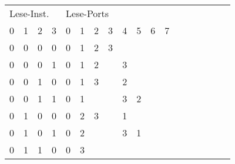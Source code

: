 \begin{table}[htbp]
\begin{minipage}{.4\textwidth}
		\begin{tabular}{cccccccccccccccccc}
			\multicolumn{4}{l}{Lese-Inst.}                 & \multicolumn{8}{|l}{Lese-Ports}                                                               \\ 
			\multicolumn{1}{c}{0} & \multicolumn{1}{c}{1} & \multicolumn{1}{c}{2} & \multicolumn{1}{c}{3} & \multicolumn{1}{|c}{0} & \multicolumn{1}{c}{1} & \multicolumn{1}{c}{2}& \multicolumn{1}{c}{3} &
			\multicolumn{1}{c}{4} & \multicolumn{1}{c}{5} & \multicolumn{1}{c}{6}& \multicolumn{1}{c}{7} \\
			\hline
			\multicolumn{1}{c}{0} & \multicolumn{1}{c}{0} & \multicolumn{1}{c}{0} & \multicolumn{1}{c}{0} & \multicolumn{1}{|c}{0} & \multicolumn{1}{c}{1} & \multicolumn{1}{c}{2}& \multicolumn{1}{c}{3} &
			\multicolumn{1}{c}{} & \multicolumn{1}{c}{} & \multicolumn{1}{c}{}& \multicolumn{1}{c}{} \\
			\multicolumn{1}{c}{0} & \multicolumn{1}{c}{0} & \multicolumn{1}{c}{0} & \multicolumn{1}{c}{1} & \multicolumn{1}{|c}{0} & \multicolumn{1}{c}{1} & \multicolumn{1}{c}{2}& \multicolumn{1}{c}{} &
			\multicolumn{1}{c}{3} & \multicolumn{1}{c}{} & \multicolumn{1}{c}{}& \multicolumn{1}{c}{} \\
			\multicolumn{1}{c}{0} & \multicolumn{1}{c}{0} & \multicolumn{1}{c}{1} & \multicolumn{1}{c}{0} & \multicolumn{1}{|c}{0} & \multicolumn{1}{c}{1} & \multicolumn{1}{c}{3}& \multicolumn{1}{c}{} &
			\multicolumn{1}{c}{2} & \multicolumn{1}{c}{} & \multicolumn{1}{c}{}& \multicolumn{1}{c}{} \\
			\multicolumn{1}{c}{0} & \multicolumn{1}{c}{0} & \multicolumn{1}{c}{1} & \multicolumn{1}{c}{1} & \multicolumn{1}{|c}{0} & \multicolumn{1}{c}{1} & \multicolumn{1}{c}{}& \multicolumn{1}{c}{} &
			\multicolumn{1}{c}{3} & \multicolumn{1}{c}{2} & \multicolumn{1}{c}{}& \multicolumn{1}{c}{} \\
			\multicolumn{1}{c}{0} & \multicolumn{1}{c}{1} & \multicolumn{1}{c}{0} & \multicolumn{1}{c}{0} & \multicolumn{1}{|c}{0} & \multicolumn{1}{c}{2} & \multicolumn{1}{c}{3}& \multicolumn{1}{c}{} &
			\multicolumn{1}{c}{1} & \multicolumn{1}{c}{} & \multicolumn{1}{c}{}& \multicolumn{1}{c}{} \\
			\multicolumn{1}{c}{0} & \multicolumn{1}{c}{1} & \multicolumn{1}{c}{0} & \multicolumn{1}{c}{1} & \multicolumn{1}{|c}{0} & \multicolumn{1}{c}{2} & \multicolumn{1}{c}{}& \multicolumn{1}{c}{} &
			\multicolumn{1}{c}{3} & \multicolumn{1}{c}{1} & \multicolumn{1}{c}{}& \multicolumn{1}{c}{} \\
			\multicolumn{1}{c}{0} & \multicolumn{1}{c}{1} & \multicolumn{1}{c}{1} & \multicolumn{1}{c}{0} & \multicolumn{1}{|c}{0} & \multicolumn{1}{c}{3} & \multicolumn{1}{c}{}& \multicolumn{1}{c}{} &

\end{tabular}
\end{minipage}
\end{table}
